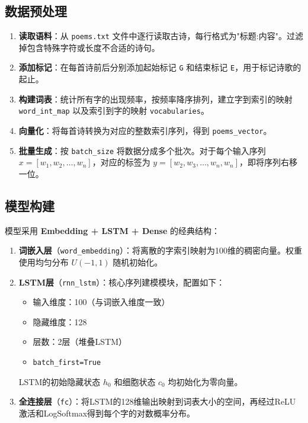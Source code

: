\documentclass[12pt, a4paper]{ctexart}
\begin{document}
\subsection{数据预处理}

\begin{enumerate}
    \item \textbf{读取语料}：从 \texttt{poems.txt} 文件中逐行读取古诗，每行格式为"标题:内容"。过滤掉包含特殊字符或长度不合适的诗句。
    \item \textbf{添加标记}：在每首诗前后分别添加起始标记 \texttt{G} 和结束标记 \texttt{E}，用于标记诗歌的起止。
    \item \textbf{构建词表}：统计所有字的出现频率，按频率降序排列，建立字到索引的映射 \texttt{word\_int\_map} 以及索引到字的映射 \texttt{vocabularies}。
    \item \textbf{向量化}：将每首诗转换为对应的整数索引序列，得到 \texttt{poems\_vector}。
    \item \textbf{批量生成}：按 \texttt{batch\_size} 将数据分成多个批次。对于每个输入序列 $x = [w_1, w_2, \ldots, w_n]$，对应的标签为 $y = [w_2, w_3, \ldots, w_n, w_n]$，即将序列右移一位。
\end{enumerate}

\subsection{模型构建}

模型采用 \textbf{Embedding + LSTM + Dense} 的经典结构：

\begin{enumerate}
    \item \textbf{词嵌入层}（\texttt{word\_embedding}）：将离散的字索引映射为100维的稠密向量。权重使用均匀分布 $U(-1, 1)$ 随机初始化。

    \item \textbf{LSTM层}（\texttt{rnn\_lstm}）：核心序列建模模块，配置如下：
    \begin{itemize}
        \item 输入维度：100（与词嵌入维度一致）
        \item 隐藏维度：128
        \item 层数：2层（堆叠LSTM）
        \item \texttt{batch\_first=True}
    \end{itemize}
    LSTM的初始隐藏状态 $h_0$ 和细胞状态 $c_0$ 均初始化为零向量。

    \item \textbf{全连接层}（\texttt{fc}）：将LSTM的128维输出映射到词表大小的空间，再经过ReLU激活和LogSoftmax得到每个字的对数概率分布。
\end{enumerate}
\end{document}
